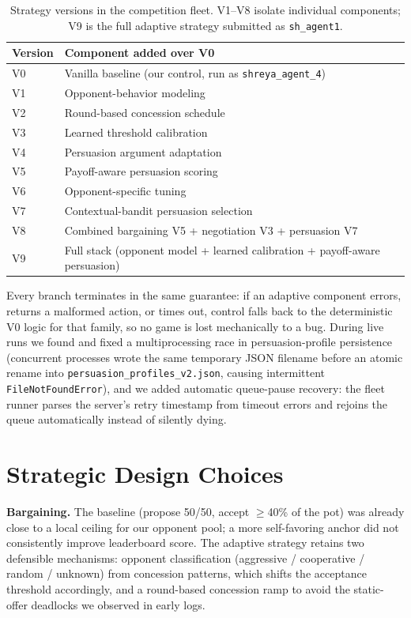 \documentclass{article}
\begin{document}
\begin{table}[t]
\caption{Strategy versions in the competition fleet. V1--V8 isolate individual components; V9 is the full adaptive strategy submitted as \texttt{sh\_agent1}.}
\label{tab:versions}
\centering
\small
\begin{tabular}{ll}
\toprule
Version & Component added over V0 \\
\midrule
V0 & Vanilla baseline (our control, run as \texttt{shreya\_agent\_4}) \\
V1 & Opponent-behavior modeling \\
V2 & Round-based concession schedule \\
V3 & Learned threshold calibration \\
V4 & Persuasion argument adaptation \\
V5 & Payoff-aware persuasion scoring \\
V6 & Opponent-specific tuning \\
V7 & Contextual-bandit persuasion selection \\
V8 & Combined bargaining V5 + negotiation V3 + persuasion V7 \\
V9 & Full stack (opponent model + learned calibration + payoff-aware persuasion) \\
\bottomrule
\end{tabular}
\end{table}

Every branch terminates in the same guarantee: if an adaptive component errors, returns a malformed action, or times out, control falls back to the deterministic V0 logic for that family, so no game is lost mechanically to a bug. During live runs we found and fixed a multiprocessing race in persuasion-profile persistence (concurrent processes wrote the same temporary JSON filename before an atomic rename into \texttt{persuasion\_profiles\_v2.json}, causing intermittent \texttt{FileNotFoundError}), and we added automatic queue-pause recovery: the fleet runner parses the server's retry timestamp from timeout errors and rejoins the queue automatically instead of silently dying.

\section{Strategic Design Choices}
\label{sec:strategy}

\textbf{Bargaining.} The baseline (propose 50/50, accept $\geq$40\% of the pot) was already close to a local ceiling for our opponent pool; a more self-favoring anchor did not consistently improve leaderboard score. The adaptive strategy retains two defensible mechanisms: opponent classification (aggressive / cooperative / random / unknown) from concession patterns, which shifts the acceptance threshold accordingly, and a round-based concession ramp to avoid the static-offer deadlocks we observed in early logs.
\end{document}
